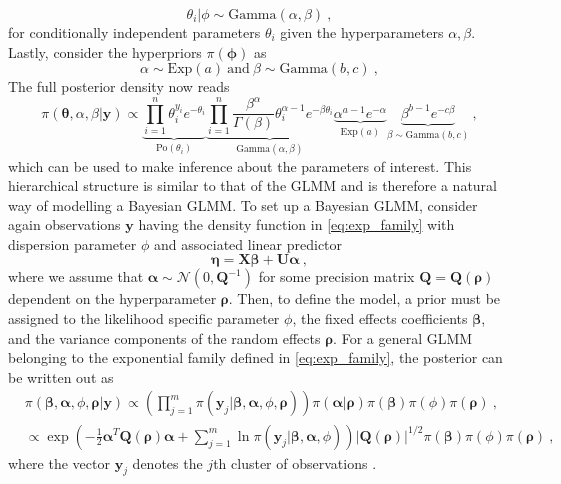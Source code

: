 \begin{equation}
    \theta_i \lvert \phi \sim \text{Gamma}(\alpha, \beta) \ ,
\end{equation}
for conditionally independent parameters $\theta_i$ given the hyperparameters $\alpha, \beta$.
Lastly, consider the hyperpriors $\pi(\boldsymbol{\phi})$ as
\begin{equation}
    \alpha \sim \text{Exp}(a) \ \text{and} \ \beta \sim \text{Gamma}(b, c) \ ,
\end{equation}
The full posterior density now reads 
\begin{equation}
    \label{eq:hierarchical_posterior_analytical}
    \pi(\boldsymbol{\theta}, \alpha, \beta \lvert \mathbf{y}) \propto \underbrace{\prod^{n}_{i=1} \theta_i^{y_i}e^{-\theta_i}}_{\text{Po}(\theta_i)} \underbrace{\prod^{n}_{i=1}\frac{\beta^{\alpha}}{\Gamma(\beta)}\theta_i^{\alpha-1}e^{-\beta \theta_i}}_{\text{Gamma}(\alpha, \beta)} \underbrace{\alpha^{a-1}e^{-\alpha}}_{\text{Exp}(a)} \underbrace{\beta^{b-1}e^{-c\beta}}_{\beta \sim \text{Gamma}(b, c)} \ ,
\end{equation}
which can be used to make inference about the parameters of interest.
This hierarchical structure is similar to that of the GLMM and is therefore a natural way of modelling a Bayesian GLMM.
To set up a Bayesian GLMM, consider again observations $\mathbf{y}$ having the density function in \eqref{eq:exp_family} with dispersion parameter $\phi$ and associated linear predictor
\begin{equation}
    \boldsymbol{\eta} = \mathbf{X}\boldsymbol{\beta} + \mathbf{U}\boldsymbol{\alpha} \ ,
\end{equation}
where we assume that $\boldsymbol{\alpha} \sim \mathcal{N}(0, \mathbf{Q}^{-1})$ for some precision matrix $\mathbf{Q} = \mathbf{Q}(\boldsymbol{\rho})$ dependent on the hyperparameter $\boldsymbol{\rho}$.
Then, to define the model, a prior must be assigned to the likelihood specific parameter $\phi$, the fixed effects coefficients $\boldsymbol{\beta}$, and the variance components of the random effects $\boldsymbol{\rho}$.
For a general GLMM belonging to the exponential family defined in \eqref{eq:exp_family}, the posterior can be written out as 
\begin{equation}
    \begin{aligned}
    &\pi(\boldsymbol{\beta}, \boldsymbol{\alpha}, \phi, \boldsymbol{\rho} \lvert \mathbf{y}) \propto \left(\prod_{j=1}^m \pi(\mathbf{y}_j \lvert \boldsymbol{\beta}, \boldsymbol{\alpha}, \phi, \boldsymbol{\rho}) \right) \pi(\boldsymbol{\alpha} \lvert \boldsymbol{\rho}) \pi(\boldsymbol{\beta}) \pi(\phi)\pi(\boldsymbol{\rho}) \ , \\
    & \propto \exp\left( -\frac{1}{2} \boldsymbol{\alpha}^T \mathbf{Q}(\boldsymbol{\rho}) \boldsymbol{\alpha} + \sum_{j=1}^{m} \ln \pi(\mathbf{y}_j \lvert \boldsymbol{\beta}, \boldsymbol{\alpha}, \phi) \right) \lvert \mathbf{Q}(\boldsymbol{\rho}) \rvert^{1/2} \pi(\boldsymbol{\beta}) \pi(\phi)\pi(\boldsymbol{\rho}) \ ,
    \end{aligned}
\end{equation}
where the vector $\mathbf{y}_j$ denotes the $j$th cluster of observations \citep{fong2010bayesian}.

